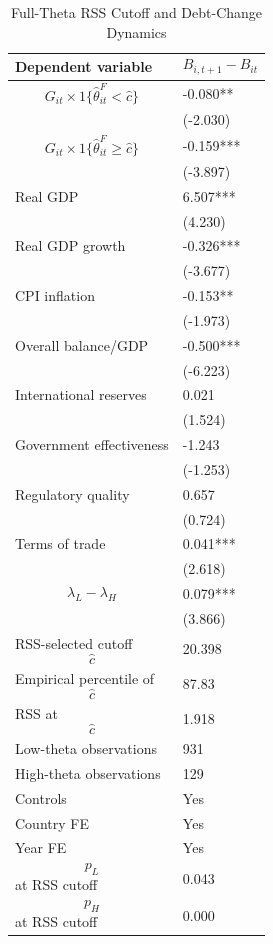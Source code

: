 \begin{table}[H]\centering
\begin{threeparttable}
\caption{Full-Theta RSS Cutoff and Debt-Change Dynamics}
\label{tab:deltaB_rss_cutoff_fulltheta}
\scriptsize
\begin{tabularx}{\textwidth}{lY}
\toprule
Dependent variable & $$B_{i,t+1}-B_{it}$$ \\
\midrule
$$G_{it}\times 1\{\widehat{\theta}^{F}_{it}<\widehat{c}\}$$ & -0.080** \\
 & (-2.030) \\
$$G_{it}\times 1\{\widehat{\theta}^{F}_{it}\geq\widehat{c}\}$$ & -0.159*** \\
 & (-3.897) \\
Real GDP & 6.507*** \\
 & (4.230) \\
Real GDP growth & -0.326*** \\
 & (-3.677) \\
CPI inflation & -0.153** \\
 & (-1.973) \\
Overall balance/GDP & -0.500*** \\
 & (-6.223) \\
International reserves & 0.021 \\
 & (1.524) \\
Government effectiveness & -1.243 \\
 & (-1.253) \\
Regulatory quality & 0.657 \\
 & (0.724) \\
Terms of trade & 0.041*** \\
 & (2.618) \\
$$\lambda_L-\lambda_H$$ & 0.079*** \\
 & (3.866) \\
\midrule
RSS-selected cutoff $$\widehat{c}$$ & 20.398 \\
Empirical percentile of $$\widehat{c}$$ & 87.83 \\
RSS at $$\widehat{c}$$ & 1.918 \\
Low-theta observations & 931 \\
High-theta observations & 129 \\
Controls & Yes \\
Country FE & Yes \\
Year FE & Yes \\
$$p_L$$ at RSS cutoff & 0.043 \\
$$p_H$$ at RSS cutoff & 0.000 \\

\end{tabularx}
\end{threeparttable}
\end{table}
